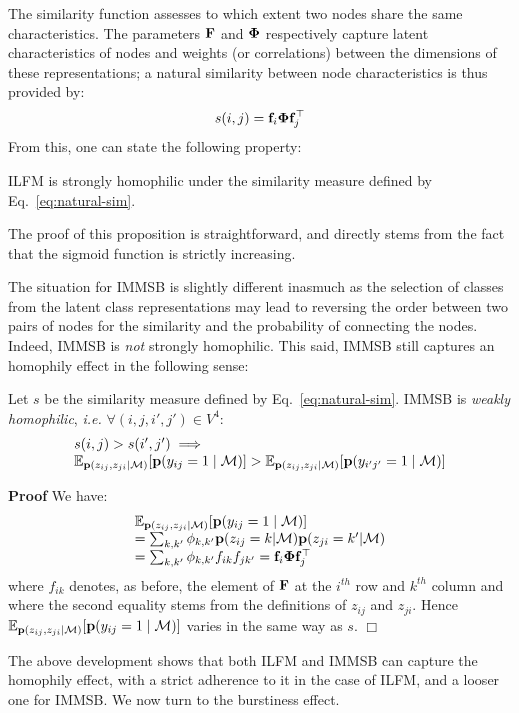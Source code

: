 The similarity function assesses to which extent two nodes share the same characteristics. The parameters $\mathbf{F}$ and $\mathbf{\Phi}$ respectively capture latent characteristics of nodes and weights (or correlations) between the dimensions of these representations; a natural similarity between node characteristics is thus provided by:
%
\begin{equation}
s(i,j) = \mat{f}_{i} \mat{\Phi} \mat{f}_j^\top
\label{eq:natural-sim}
\end{equation}
%
From this, one can state the following property:
%
\begin{proposition}[]
ILFM is strongly homophilic under the similarity measure defined by Eq.~\ref{eq:natural-sim}.
\end{proposition}
%
\noindent The proof of this proposition is straightforward, and directly stems from the fact that the sigmoid function is strictly increasing.

The situation for IMMSB is slightly different inasmuch as the selection of classes from the latent class representations may lead to reversing the order between two pairs of nodes for the similarity and the probability of connecting the nodes. Indeed, IMMSB is \textit{not} strongly homophilic. This said, IMMSB still captures an homophily effect in the following sense:
%
\begin{proposition}[]
Let $s$ be the similarity measure defined by Eq.~\ref{eq:natural-sim}. IMMSB is \emph{weakly homophilic}, \textit{i.e.}  $\forall (i,j,i',j') \in V^4$:
%
\begin{equation}
\begin{array}{l}
s(i,j) > s(i',j')  \implies \nonumber \\
\mathbb{E}_{\mathbf{p}(z_{ij},z_{ji}|\mathcal{M})}[\mathbf{p}(y_{ij}=1 \mid \mathcal{M})] > \mathbb{E}_{\mathbf{p}(z_{ij},z_{ji}|\mathcal{M})}[\mathbf{p}(y_{i'j'}=1  \mid \mathcal{M})] \nonumber
\end{array}
\end{equation}
\end{proposition}
%
\noindent \textbf{Proof} We have:
%
\begin{equation}
\begin{array}{l}
\mathbb{E}_{\mathbf{p}(z_{ij},z_{ji}|\mathcal{M})}[\mathbf{p}(y_{ij}=1 \mid \mathcal{M})]\nonumber \\
= \sum_{k,k'} \phi_{k,k'} \mathbf{p}(z_{ij}=k|\mathcal{M}) \mathbf{p}(z_{ji}=k'|\mathcal{M}) \nonumber \\
= \sum_{k,k'} \phi_{k,k'} f_{ik} f_{jk'} = \mathbf{f}_i \mathbf{\Phi} \mathbf{f}_j^\top \nonumber
\end{array}
\end{equation}
%
where $f_{ik}$ denotes, as before, the element of $\mathbf{F}$ at the $i^{th}$ row and $k^{th}$ column and where the second equality stems from the definitions of $z_{ij}$ and $z_{ji}$. Hence $\mathbb{E}_{\mathbf{p}(z_{ij},z_{ji}|\mathcal{M})}[\mathbf{p}(y_{ij}=1 \mid \mathcal{M})]$ varies in the same way as $s$. \hspace{3.5cm} $\Box$

The above development shows that both ILFM and IMMSB can capture the homophily effect, with a strict adherence to it in the case of ILFM, and a looser one for IMMSB. We now turn to the burstiness effect.